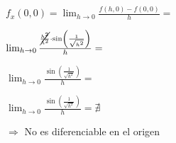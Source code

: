 \documentclass[../practica_04.tex]{subfiles}
\begin{document}
\begin{enumerate}
            $f_x(0,0) = \lim_{h\to0} \frac{f(h,0)-f(0,0)}{h} = $

                $\lim_{h\to0} \frac{\cancel{\frac{h^2}{h^2}}\cdot \sin(\frac{1}{\sqrt{h^2}})}{h} = $

                $\lim_{h\to0} \frac{\sin(\frac{1}{\sqrt{h^2}})}{h} = $

                $\lim_{h\to0} \frac{\sin(\frac{1}{\sqrt{h^2}})}{h} = \nexists $

                $\Rightarrow$ No es diferenciable en el origen

    \end{enumerate}
\end{document}
